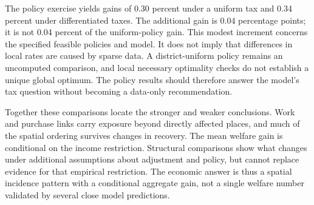 The policy exercise yields gains of 0.30 percent under a uniform tax and 0.34
percent under differentiated taxes. The additional gain is 0.04 percentage points;
it is not 0.04 percent of the uniform-policy gain. This modest increment concerns
the specified feasible policies and model. It does not imply that differences in
local rates are caused by sparse data. A district-uniform policy remains an
uncomputed comparison, and local necessary optimality checks do not establish
a unique global optimum. The policy results should therefore answer the model's
tax question without becoming a data-only recommendation.

Together these comparisons locate the stronger and weaker conclusions. Work
and purchase links carry exposure beyond directly affected places, and much of
the spatial ordering survives changes in recovery. The mean welfare gain is
conditional on the income restriction. Structural comparisons show what changes
under additional assumptions about adjustment and policy, but cannot replace
evidence for that empirical restriction. The economic answer is thus a spatial
incidence pattern with a conditional aggregate gain, not a single welfare number
validated by several close model predictions.
